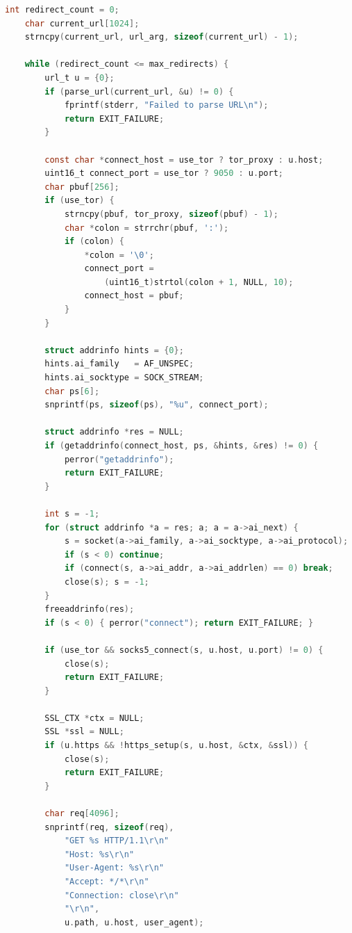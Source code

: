 \begin{lstlisting}[style=newcode,language=C,firstnumber=last]
    int redirect_count = 0;
    char current_url[1024];
    strncpy(current_url, url_arg, sizeof(current_url) - 1);

    while (redirect_count <= max_redirects) {
        url_t u = {0};
        if (parse_url(current_url, &u) != 0) {
            fprintf(stderr, "Failed to parse URL\n");
            return EXIT_FAILURE;
        }

        const char *connect_host = use_tor ? tor_proxy : u.host;
        uint16_t connect_port = use_tor ? 9050 : u.port;
        char pbuf[256];
        if (use_tor) {
            strncpy(pbuf, tor_proxy, sizeof(pbuf) - 1);
            char *colon = strrchr(pbuf, ':');
            if (colon) {
                *colon = '\0';
                connect_port =
                    (uint16_t)strtol(colon + 1, NULL, 10);
                connect_host = pbuf;
            }
        }

        struct addrinfo hints = {0};
        hints.ai_family   = AF_UNSPEC;
        hints.ai_socktype = SOCK_STREAM;
        char ps[6];
        snprintf(ps, sizeof(ps), "%u", connect_port);

        struct addrinfo *res = NULL;
        if (getaddrinfo(connect_host, ps, &hints, &res) != 0) {
            perror("getaddrinfo");
            return EXIT_FAILURE;
        }

        int s = -1;
        for (struct addrinfo *a = res; a; a = a->ai_next) {
            s = socket(a->ai_family, a->ai_socktype, a->ai_protocol);
            if (s < 0) continue;
            if (connect(s, a->ai_addr, a->ai_addrlen) == 0) break;
            close(s); s = -1;
        }
        freeaddrinfo(res);
        if (s < 0) { perror("connect"); return EXIT_FAILURE; }

        if (use_tor && socks5_connect(s, u.host, u.port) != 0) {
            close(s);
            return EXIT_FAILURE;
        }

        SSL_CTX *ctx = NULL;
        SSL *ssl = NULL;
        if (u.https && !https_setup(s, u.host, &ctx, &ssl)) {
            close(s);
            return EXIT_FAILURE;
        }

        char req[4096];
        snprintf(req, sizeof(req),
            "GET %s HTTP/1.1\r\n"
            "Host: %s\r\n"
            "User-Agent: %s\r\n"
            "Accept: */*\r\n"
            "Connection: close\r\n"
            "\r\n",
            u.path, u.host, user_agent);


\end{lstlisting}
